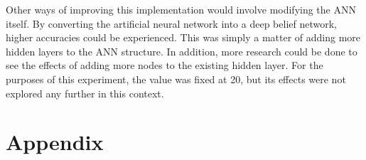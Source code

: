 \documentclass{article}
\begin{document}
Other ways of improving this implementation would involve modifying the ANN itself. By converting the artificial neural network into a deep belief network, higher accuracies could be experienced. This was simply a matter of adding more hidden layers to the ANN structure. In addition, more research could be done to see the effects of adding more nodes to the existing hidden layer. For the purposes of this experiment, the value was fixed at 20, but its effects were not explored any further in this context.


\section{Appendix}
\label{sec:appendix}



\end{document}
